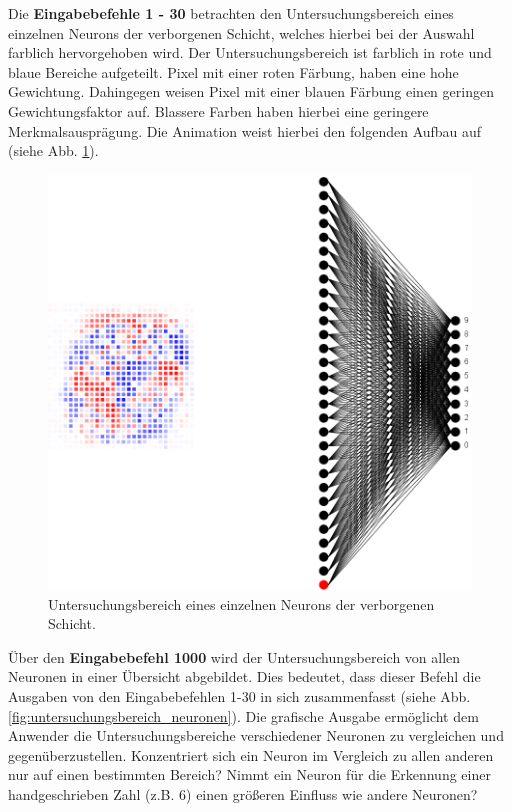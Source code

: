 \noindent
Die \textbf{Eingabebefehle 1 - 30} betrachten den Untersuchungsbereich eines einzelnen Neurons der verborgenen Schicht, welches hierbei bei der Auswahl farblich hervorgehoben wird. Der Untersuchungsbereich ist farblich in rote und blaue Bereiche aufgeteilt. Pixel mit einer roten Färbung, haben eine hohe Gewichtung. Dahingegen weisen Pixel mit einer blauen Färbung einen geringen Gewichtungsfaktor auf. Blassere Farben haben hierbei eine geringere Merkmalsausprägung. Die Animation weist hierbei den folgenden Aufbau auf (siehe Abb. \ref{fig:untersuchungsbereich_neuron}). \\

\begin{figure}[!hbt]
	\centering
	\includegraphics[scale=0.8]{Bilder/untersuchungsbereich_neuron}
	\caption{Untersuchungsbereich eines einzelnen Neurons der verborgenen Schicht.} 
	\label{fig:untersuchungsbereich_neuron} 
\end{figure}

\noindent
Über den \textbf{Eingabebefehl 1000} wird der Untersuchungsbereich von allen Neuronen in einer Übersicht abgebildet. Dies bedeutet, dass dieser Befehl die Ausgaben von den Eingabebefehlen 1-30 in sich zusammenfasst (siehe Abb. \ref{fig:untersuchungsbereich_neuronen}). Die grafische Ausgabe ermöglicht dem Anwender die Untersuchungsbereiche verschiedener Neuronen zu vergleichen und gegenüberzustellen. Konzentriert sich ein Neuron im Vergleich zu allen anderen nur auf einen bestimmten Bereich? Nimmt ein Neuron für die Erkennung einer handgeschrieben Zahl (z.B. $6$) einen größeren Einfluss wie andere Neuronen? \\

